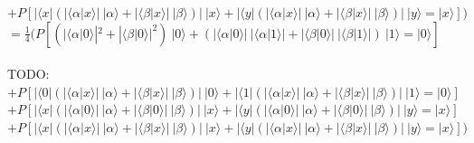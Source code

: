 \documentclass[a4paper]{scrartcl}
\begin{document}
\begin{enumerate}[a)]
$+ P[|\langle x| (|\langle \alpha|x\rangle|~|\alpha\rangle + |\langle \beta|x\rangle|~|\beta\rangle)|~|x\rangle + |\langle y| (|\langle \alpha|x\rangle|~|\alpha\rangle + |\langle \beta|x\rangle|~|\beta\rangle)|~|y\rangle =|x\rangle])$\\
$=\frac{1}{4} (P[(|\langle \alpha|0\rangle|^2 + |\langle \beta|0\rangle|^2)~|0\rangle + (|\langle \alpha|0\rangle|~|\langle \alpha|1\rangle| + |\langle \beta|0\rangle|~|\langle \beta|1\rangle|)~|1\rangle=|0\rangle]$\\\\
TODO: 
$+ P[|\langle 0|(|\langle \alpha|x\rangle|~|\alpha\rangle + |\langle \beta|x\rangle|~|\beta\rangle)|~|0\rangle + |\langle 1|(|\langle \alpha|x\rangle|~|\alpha\rangle + |\langle \beta|x\rangle|~|\beta\rangle)|~|1\rangle =|0\rangle]$\\
$+ P[|\langle x| (|\langle \alpha|0\rangle|~|\alpha\rangle + |\langle \beta|0\rangle|~|\beta\rangle)|~|x\rangle + |\langle y| (|\langle \alpha|0\rangle|~|\alpha\rangle + |\langle \beta|0\rangle|~|\beta\rangle)|~|y\rangle =|x\rangle]$\\
$+ P[|\langle x| (|\langle \alpha|x\rangle|~|\alpha\rangle + |\langle \beta|x\rangle|~|\beta\rangle)|~|x\rangle + |\langle y| (|\langle \alpha|x\rangle|~|\alpha\rangle + |\langle \beta|x\rangle|~|\beta\rangle)|~|y\rangle =|x\rangle])$\\



\end{enumerate}
\end{document}
